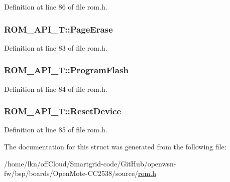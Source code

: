 Definition at line 86 of file rom.\+h.

\subsubsection[{\texorpdfstring{Page\+Erase}{PageErase}}]{ R\+O\+M\+\_\+\+A\+P\+I\+\_\+\+T\+::\+Page\+Erase}\hypertarget{struct_r_o_m___a_p_i___t_af70c2fb4c80efffcbb27163768ebd22b}{}\label{struct_r_o_m___a_p_i___t_af70c2fb4c80efffcbb27163768ebd22b}


Definition at line 83 of file rom.\+h.

\subsubsection[{\texorpdfstring{Program\+Flash}{ProgramFlash}}]{ R\+O\+M\+\_\+\+A\+P\+I\+\_\+\+T\+::\+Program\+Flash}\hypertarget{struct_r_o_m___a_p_i___t_a9500acfc05232498a409e64fa7fa7836}{}\label{struct_r_o_m___a_p_i___t_a9500acfc05232498a409e64fa7fa7836}


Definition at line 84 of file rom.\+h.

\subsubsection[{\texorpdfstring{Reset\+Device}{ResetDevice}}]{ R\+O\+M\+\_\+\+A\+P\+I\+\_\+\+T\+::\+Reset\+Device}\hypertarget{struct_r_o_m___a_p_i___t_a92aca0d3f70969de09c8a0c9599e3931}{}\label{struct_r_o_m___a_p_i___t_a92aca0d3f70969de09c8a0c9599e3931}


Definition at line 85 of file rom.\+h.



The documentation for this struct was generated from the following file\+:\begin{DoxyCompactItemize}
\item 
/home/lkn/off\+Cloud/\+Smartgrid-\/code/\+Git\+Hub/openwsn-\/fw/bsp/boards/\+Open\+Mote-\/\+C\+C2538/source/\hyperlink{rom_8h}{rom.\+h}\end{DoxyCompactItemize}
